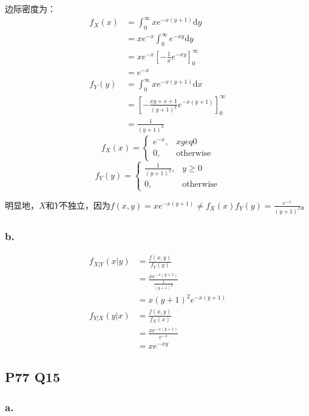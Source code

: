 \documentclass[a4paper,12pt]{ctexart}
\begin{document}
边际密度为：
\begin{align*}
	f_X(x) &= \int_{0}^{\infty} xe^{-x(y+1)} \mathrm{d}y \\
	&= xe^{-x} \int_{0}^{\infty} e^{-xy} \mathrm{d}y \\
	&= xe^{-x} \left[-\frac{1}{x} e^{-xy}\right]_{0}^{\infty} \\
	&= e^{-x} \\ 
	f_Y(y) &= \int_{0}^{\infty} xe^{-x(y+1)} \mathrm{d}x \\
	&= \left[- \frac{xy + x + 1}{(y+1)^2} e^{-x(y+1)} \right]_{0}^{\infty} \\
	&= \frac{1}{(y+1)^2}
\end{align*}
\begin{equation*}
	f_X(x) =
	\begin{cases}
		e^{-x}, & x geq 0 \\
		0, & \text{otherwise}
	\end{cases}
\end{equation*}
\begin{equation*}
	f_Y(y) =
	\begin{cases}
		\frac{1}{(y+1)^2}, & y \geq 0 \\
		0, & \text{otherwise}
	\end{cases}
\end{equation*}

明显地，$X$和$Y$不独立，因为$f(x,y) = xe^{-x(y+1)} \neq f_X(x)f_Y(y) = \frac{e^{-x}}{(y+1)^2}$。

\subsubsection*{b.}

\begin{align*}
	f_{X|Y}(x|y) &= \frac{f(x,y)}{f_Y(y)} \\
	&= \frac{xe^{-x(y+1)}}{\frac{1}{(y+1)^2}} \\
	&= x(y+1)^2 e^{-x(y+1)} \\
	f_{Y|X}(y|x) &= \frac{f(x,y)}{f_X(x)} \\
	&= \frac{xe^{-x(y+1)}}{e^{-x}} \\
	&= x e^{-xy}
\end{align*}

\subsection*{P77 Q15}

\subsubsection*{a.}
\end{document}
